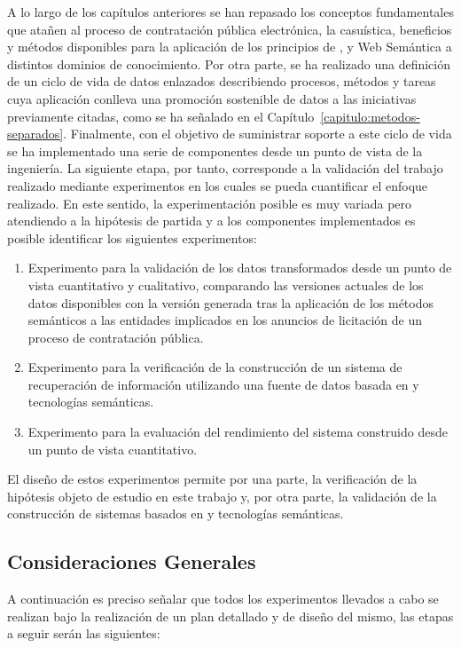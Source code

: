 A lo largo de los capítulos anteriores se han repasado los conceptos fundamentales que atañen 
al proceso de contratación pública electrónica, la casuística, beneficios y métodos disponibles 
para la aplicación de los principios de \opendata, \linkeddata y Web Semántica a distintos dominios 
de conocimiento. Por otra parte, se ha realizado una definición de un ciclo de vida de datos enlazados 
describiendo procesos, métodos y tareas cuya aplicación conlleva una promoción sostenible de datos a las iniciativas 
previamente citadas, como se ha señalado en el Capítulo~\ref{capitulo:metodos-separados}. Finalmente, con el objetivo 
de suministrar soporte a este ciclo de vida se ha implementado una serie de componentes desde un punto de vista de la 
ingeniería. La siguiente etapa, por tanto, corresponde a la validación del trabajo realizado mediante experimentos en los 
cuales se pueda cuantificar el enfoque realizado. En este sentido, la experimentación posible es muy variada pero atendiendo 
a la hipótesis de partida y a los componentes implementados es posible identificar los siguientes experimentos:

\begin{enumerate}
 \item Experimento para la validación de los datos transformados desde un punto de vista cuantitativo y cualitativo, comparando las versiones 
actuales de los datos disponibles con la versión generada tras la aplicación de los métodos semánticos a las entidades 
implicados en los anuncios de licitación de un proceso de contratación pública.
\item Experimento para la verificación de la construcción de un sistema de recuperación de información utilizando una fuente 
de datos basada en \linkeddata y tecnologías semánticas.
\item Experimento para la evaluación del rendimiento del sistema construido desde un punto de vista cuantitativo.

\end{enumerate}

El diseño de estos experimentos permite por una parte, la verificación de la hipótesis objeto de estudio en este trabajo y, por otra parte, 
la validación de la construcción de sistemas basados en \linkeddata y tecnologías semánticas.

\subsection{Consideraciones Generales}\label{exp-general}
A continuación es preciso señalar que todos los experimentos llevados a cabo se realizan 
bajo la realización de un plan detallado y de diseño del mismo, las etapas a seguir serán 
las siguientes:

